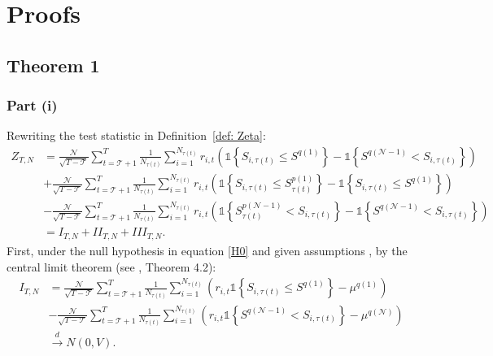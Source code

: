 \section{Proofs}


\subsection{Theorem 1}
\label{Proof of th:observable}

\subsubsection{Part (i)}

Rewriting the test statistic in Definition~\ref{def: Zeta}:
\begin{align*}
Z_{T,N} &= \frac{\mathcal{N}}{\sqrt{T-\mathcal{T}}}\sum_{t=\mathcal{T}+1}^{T}\frac{1}{N_{\tau(t)}} \sum_{i=1}^{N_{\tau(t)}} r_{i,t} \left( \mathds{1}\left\{ S_{i,\tau(t) }\leq S^{q(1)}\right\} - \mathds{1}\left\{ S^{q(\mathcal{N}-1)} < S_{i,\tau(t) }\right\} \right) \\
& + \frac{\mathcal{N}}{\sqrt{T-\mathcal{T}}}\sum_{t=\mathcal{T}+1}^{T}\frac{1}{N_{\tau(t)}} \sum_{i=1}^{N_{\tau(t)}}r_{i,t}\left( \mathds{1}\left\{ S_{i,\tau(t) }\leq S_{\tau(t) }^{p(1)}\right\} - \mathds{1}\left\{ S_{i,\tau(t) }\leq S^{q(1)}\right\} \right) \\
&- \frac{\mathcal{N}}{\sqrt{T-\mathcal{T}}}\sum_{t=\mathcal{T}+1}^{T}\frac{1}{N_{\tau(t)}} \sum_{i=1}^{N_{\tau(t)}}r_{i,t} \left( \mathds{1} \left\{ S_{\tau(t) }^{p(\mathcal{N} - 1)} < S_{i,\tau(t) } \right\} - \mathds{1}\left\{ S^{q(\mathcal{N} -1)} < S_{i,\tau(t) } \right\} \right) \\
&= I_{T,N} + II_{T,N} + III_{T,N}.
\end{align*}
First, under the null hypothesis in equation \eqref{H0} and given assumptions , by the central limit theorem (see \cite{rio2017asymptotic}, Theorem 4.2):
\begin{align*}
I_{T,N} &= \frac{\mathcal{N}}{\sqrt{T-\mathcal{T}}}\sum_{t=\mathcal{T}+1}^{T}\frac{1}{N_{\tau(t)}} \sum_{i=1}^{N_{\tau(t)}}\left( r_{i,t} \mathds{1}\left\{ S_{i,\tau(t) } \leq S^{q(1)}\right\} -\mu^{q(1)}\right) \\
& - \frac{\mathcal{N}}{\sqrt{T-\mathcal{T}}}\sum_{t=\mathcal{T}+1}^{T}\frac{1}{N_{\tau(t)}} \sum_{i=1}^{N_{\tau(t)}} \left( r_{i,t} \mathds{1}\left\{ S^{q(\mathcal{N} -1)} < S_{i,\tau(t) }\right\} -\mu^{q(\mathcal{N})}\right) \\
& \overset{d}{\rightarrow} N \left( 0, V \right).
\end{align*}
